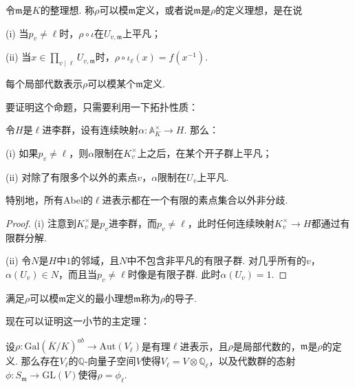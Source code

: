 \begin{cdef}
    令$\mathfrak{m}$是$K$的整理想. 称$\rho$可以模$\mathfrak{m}$定义，或者说$\mathfrak{m}$是$\rho$的定义理想，是在说

    (i) 当$p_v\neq \ell$时，$\rho\circ \iota$在$U_{v, \mathfrak{m}}$上平凡；

    (ii) 当$x\in \prod_{v\mid \ell} U_{v, \mathfrak{m}}$时，$\rho\circ\iota_{\ell} (x) = f(x^{-1})$.
\end{cdef}

\begin{cprop}
    每个局部代数表示$\rho$可以模某个$\mathfrak{m}$定义.
\end{cprop}

要证明这个命题，只需要利用一下拓扑性质：

\begin{clem}
    令$H$是$\ell$进李群，设有连续映射$\alpha: \mathbb{A}_{K}^{\times}\to H$. 那么：

    (i) 如果$p_v\neq \ell$，则$\alpha$限制在$K_v^{\times}$上之后，在某个开子群上平凡；

    (ii) 对除了有限多个以外的素点$v$，$\alpha$限制在$U_v$上平凡.

    特别地，所有Abel的$\ell$进表示都在一个有限的素点集合以外非分歧.
\end{clem}

\begin{proof}
    (i) 注意到$K_v^{\times}$是$p_v$进李群，而$p_v\neq \ell$，此时任何连续映射$K_v^{\times}\to H$都通过有限群分解.

    (ii) 令$N$是$H$中$1$的邻域，且$N$中不包含非平凡的有限子群. 对几乎所有的$v$，$\alpha(U_v)\in N$，而且当$p_v\neq \ell$时像是有限子群. 此时$\alpha(U_v)=1$.
\end{proof}

满足$\rho$可以模$\mathfrak{m}$定义的最小理想$\mathfrak{m}$称为$\rho$的导子.

现在可以证明这一小节的主定理：

\begin{cthm}
    设$\rho: \mathrm{Gal}(\overline{K}/K)^{ab} \to \mathrm{Aut}(V_{\ell})$是有理$\ell$进表示，且$\rho$是局部代数的，$\mathfrak{m}$是$\rho$的定义\modulus . 那么存在$V_{\ell}$的$\mathbb{Q}$-向量子空间$V$使得$V_{\ell} = V\otimes \mathbb{Q}_{\ell}$，以及代数群的态射$\phi: S_{\mathfrak{m}}\to \mathrm{GL}(V)$使得$\rho=\phi_{\ell}$. \label{galois::when_sm}
\end{cthm}

